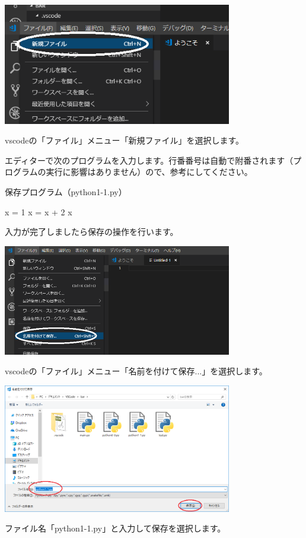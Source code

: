 \documentclass[11pt,a4paper,dvipdfmx,titlepage]{jsreport}
\begin{document}
\includegraphics[width=10cm]{images/image5.png}


vscodeの「ファイル」メニュー「新規ファイル」を選択します。

エディターで次のプログラムを入力します。行番番号は自動で附番されます（プログラムの実行に影響はありません）ので、参考にしてください。

\begin{grabox}{保存プログラム（python1-1.py）}
\begin{listing}{1}
x = 1
x = x + 2
x
\end{listing}
\end{grabox}
入力が完了しましたら保存の操作を行います。

\includegraphics[width=10cm]{images/image4.png}

vscodeの「ファイル」メニュー「名前を付けて保存...」を選択します。

\includegraphics[width=10cm]{images/image13.png}

ファイル名「python1-1.py」と入力して保存を選択します。
\end{document}
